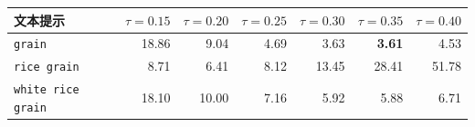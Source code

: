 \begin{tabular}{lrrrrrr}
\toprule
文本提示 & $\tau=0.15$ & $\tau=0.20$ & $\tau=0.25$ & $\tau=0.30$ & $\tau=0.35$ & $\tau=0.40$ \\
\midrule
\texttt{grain} & 18.86 & 9.04 & 4.69 & 3.63 & \textbf{3.61} & 4.53 \\
\texttt{rice grain} & 8.71 & 6.41 & 8.12 & 13.45 & 28.41 & 51.78 \\
\texttt{white rice grain} & 18.10 & 10.00 & 7.16 & 5.92 & 5.88 & 6.71 \\
\bottomrule
\end{tabular}